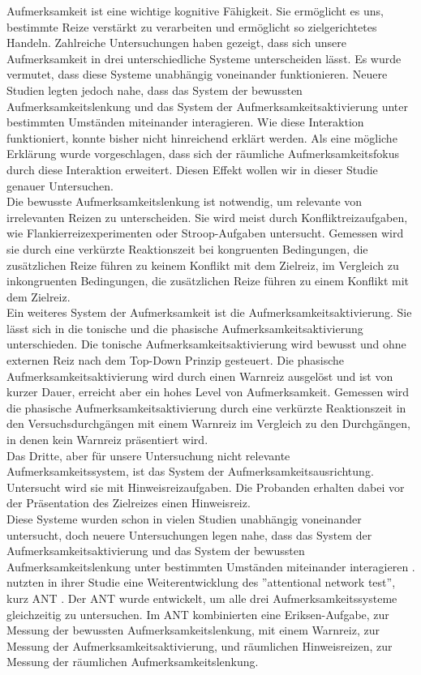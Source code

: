 Aufmerksamkeit ist eine wichtige kognitive Fähigkeit. Sie ermöglicht es uns, bestimmte Reize verstärkt zu verarbeiten und ermöglicht so zielgerichtetes Handeln. Zahlreiche Untersuchungen haben gezeigt, dass sich unsere Aufmerksamkeit in drei unterschiedliche Systeme unterscheiden lässt. Es wurde vermutet, dass diese Systeme unabhängig voneinander funktionieren. Neuere Studien legten jedoch nahe, dass das System der bewussten Aufmerksamkeitslenkung und das System der Aufmerksamkeitsaktivierung unter bestimmten Umständen miteinander interagieren. Wie diese Interaktion funktioniert, konnte bisher nicht hinreichend erklärt werden. Als eine mögliche Erklärung wurde vorgeschlagen, dass sich der räumliche Aufmerksamkeitsfokus durch diese Interaktion erweitert. Diesen Effekt wollen wir in dieser Studie genauer Untersuchen.\\
Die bewusste Aufmerksamkeitslenkung ist notwendig, um relevante von irrelevanten Reizen zu unterscheiden. Sie wird meist durch Konfliktreizaufgaben, wie Flankierreizexperimenten \cite{eriksen1974effects} oder Stroop-Aufgaben \cite{stroop1935studies} untersucht. Gemessen wird sie durch eine verkürzte Reaktionszeit bei kongruenten Bedingungen, die zusätzlichen Reize führen zu keinem Konflikt mit dem Zielreiz, im Vergleich zu inkongruenten Bedingungen, die zusätzlichen Reize führen zu einem Konflikt mit dem Zielreiz.\\
Ein weiteres System der Aufmerksamkeit ist die Aufmerksamkeitsaktivierung. Sie lässt sich in die tonische und die phasische Aufmerksamkeitsaktivierung unterschieden. Die tonische Aufmerksamkeitsaktivierung wird bewusst und ohne externen Reiz nach dem Top-Down Prinzip gesteuert. Die phasische Aufmerksamkeitsaktivierung wird durch einen Warnreiz ausgelöst und ist von kurzer Dauer, erreicht aber ein hohes Level von Aufmerksamkeit. Gemessen wird die phasische Aufmerksamkeitsaktivierung durch eine verkürzte Reaktionszeit in den Versuchsdurchgängen mit einem Warnreiz im Vergleich zu den Durchgängen, in denen kein Warnreiz präsentiert wird.\\
Das Dritte, aber für unsere Untersuchung nicht relevante Aufmerksamkeitssystem, ist das System der Aufmerksamkeitsausrichtung. Untersucht wird sie mit Hinweisreizaufgaben. Die Probanden erhalten dabei vor der Präsentation des Zielreizes einen Hinweisreiz.\\ 
Diese Systeme wurden schon in vielen Studien unabhängig voneinander untersucht, doch neuere Untersuchungen legen nahe, dass das System der Aufmerksamkeitsaktivierung und das System der bewussten Aufmerksamkeitslenkung unter bestimmten Umständen miteinander interagieren \cite{callejas2004three,weinbach2012relationship}. \textcite{weinbach2012relationship} nutzten in ihrer Studie eine Weiterentwicklung des ''attentional network test'', kurz ANT \cite{fan2002testing}. Der ANT wurde entwickelt, um alle drei Aufmerksamkeitssysteme gleichzeitig zu untersuchen. Im ANT kombinierten \textcite{fan2002testing} eine Eriksen-Aufgabe, zur Messung der bewussten Aufmerksamkeitslenkung, mit einem Warnreiz, zur Messung der Aufmerksamkeitsaktivierung, und räumlichen Hinweisreizen, zur Messung der räumlichen Aufmerksamkeitslenkung.\\
